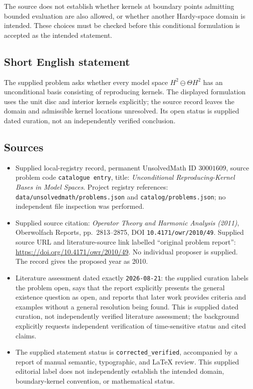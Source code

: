 \documentclass[11pt]{article}
\begin{document}
The source does not establish whether kernels at boundary points admitting bounded evaluation are also allowed, or whether another Hardy-space domain is intended. These choices must be checked before this conditional formulation is accepted as the intended statement.
\subsection{Short English statement}
The supplied problem asks whether every model space \(H^2\ominus\Theta H^2\) has an unconditional basis consisting of reproducing kernels. The displayed formulation uses the unit disc and interior kernels explicitly; the source record leaves the domain and admissible kernel locations unresolved. Its open status is supplied dated curation, not an independently verified conclusion.
\subsection{Sources}
\begin{itemize}
\item Supplied local-registry record, permanent UnsolvedMath ID \(30001609\), source problem code \texttt{catalogue entry}, title: \emph{Unconditional Reproducing-Kernel Bases in Model Spaces}. Project registry references: \texttt{data/unsolvedmath/problems.json} and \texttt{catalog/problems.json}; no independent file inspection was performed.
\item Supplied source citation: \emph{Operator Theory and Harmonic Analysis (2011)}, Oberwolfach Reports, pp.~2813--2875, DOI \texttt{10.4171/owr/2010/49}. Supplied source URL and literature-source link labelled ``original problem report'': \url{https://doi.org/10.4171/owr/2010/49}. No individual proposer is supplied. The record gives the proposed year as 2010.
\item Literature assessment dated exactly \texttt{2026-08-21}: the supplied curation labels the problem open, says that the report explicitly presents the general existence question as open, and reports that later work provides criteria and examples without a general resolution being found. This is supplied dated curation, not independently verified literature assessment; the background explicitly requests independent verification of time-sensitive status and cited claims.
\item The supplied statement status is \texttt{corrected\_verified}, accompanied by a report of manual semantic, typographic, and LaTeX review. This supplied editorial label does not independently establish the intended domain, boundary-kernel convention, or mathematical status.
\end{itemize}
\end{document}

